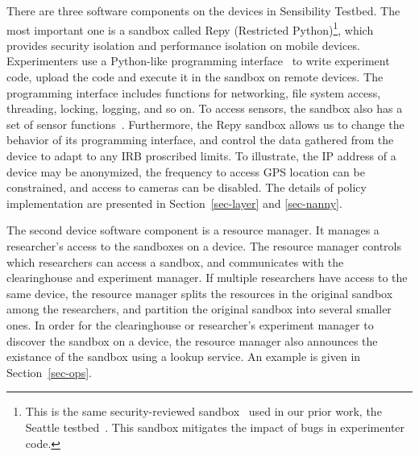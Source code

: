 There are three software components on the devices in Sensibility 
Testbed. The most important one is a sandbox called Repy (Restricted 
Python)\footnote{\scriptsize This is the 
same security-reviewed sandbox~\cite{cappos2010retaining} used in
our prior work, the Seattle testbed~\cite{seattle}. This sandbox
mitigates the impact of bugs in experimenter code.}, which 
provides security isolation and performance isolation on mobile devices.
Experimenters use a Python-like programming interface~\cite{repyv2}
to write experiment code, upload the code and execute it in the
sandbox on remote devices. The programming interface includes functions for networking, 
file system access, threading, locking, logging, and so on. To access sensors, 
the sandbox also has a set of sensor functions~\cite{sensors}. 
%
Furthermore, the Repy sandbox allows us to change the 
behavior of its programming interface, and control the 
data gathered from the device to adapt to any IRB proscribed limits. 
To illustrate, the IP address of a device may be anonymized, 
the frequency to access GPS location can be constrained, and 
access to cameras can be disabled. 
The details of policy implementation are presented in 
Section~\ref{sec-layer} and \ref{sec-nanny}.

The second device software component is a resource manager. It 
manages a researcher's access to the sandboxes on a device. The 
resource manager controls which researchers 
can access a sandbox, and communicates with the clearinghouse
and experiment manager. If multiple researchers have access to 
the same device, the resource manager splits the resources in 
the original sandbox among the researchers, and partition the 
original sandbox into several smaller ones. In order for the clearinghouse
or researcher's experiment manager to discover the sandbox on a 
device, the resource manager also announces the existance of the 
sandbox using a lookup service. An example is given in 
Section~\ref{sec-ops}.

